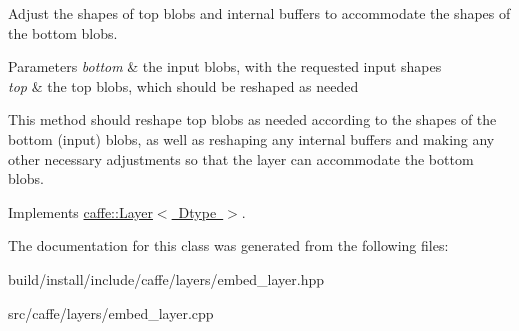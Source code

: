 Adjust the shapes of top blobs and internal buffers to accommodate the shapes of the bottom blobs. 


\begin{DoxyParams}{Parameters}
{\em bottom} & the input blobs, with the requested input shapes \\
\hline
{\em top} & the top blobs, which should be reshaped as needed\\
\hline
\end{DoxyParams}
This method should reshape top blobs as needed according to the shapes of the bottom (input) blobs, as well as reshaping any internal buffers and making any other necessary adjustments so that the layer can accommodate the bottom blobs. 

Implements \mbox{\hyperlink{classcaffe_1_1_layer_a7fe981e8af8d93d587acf2a952be563d}{caffe\+::\+Layer$<$ Dtype $>$}}.



The documentation for this class was generated from the following files\+:\begin{DoxyCompactItemize}
\item 
build/install/include/caffe/layers/embed\+\_\+layer.\+hpp\item 
src/caffe/layers/embed\+\_\+layer.\+cpp\end{DoxyCompactItemize}

